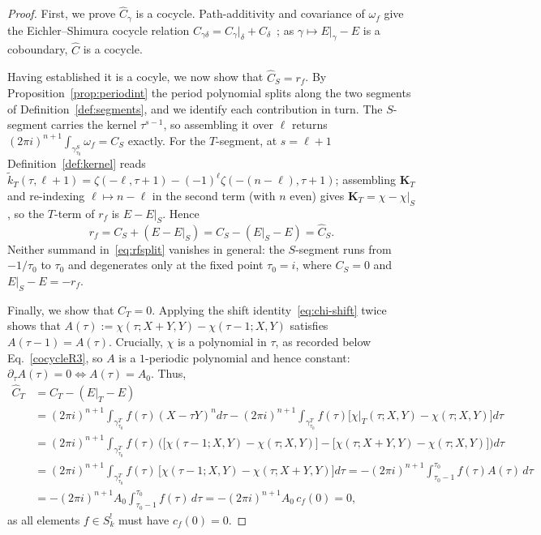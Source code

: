 \documentclass[11pt]{article}
\newcommand{\tk}{\widetilde{k}_T}
\begin{document}
\begin{proof}
First, we prove $\hat C_\gamma$ is a cocycle. Path-additivity and covariance of $\omega_f$ give the Eichler--Shimura cocycle relation
$C_{\gamma\delta}=C_\gamma|_\delta+C_\delta$~\cite{BCD2018,KZ1984}; as $\gamma\mapsto E|_\gamma-E$ is a
coboundary, $\hat C$ is a cocycle.

Having established it is a cocyle, we now show that $\hat C_S=r_f$. By
Proposition~\ref{prop:periodint} the period polynomial splits along the two segments of
Definition~\ref{def:segments}, and we identify each contribution in turn. The $S$-segment carries
the kernel $\tau^{s-1}$, so assembling it over $\ell$ returns
$(2\pi i)^{n+1}\int_{\gamma^S_{\tau_0}}\omega_f=C_S$ exactly. For the $T$-segment, at $s=\ell+1$
Definition~\ref{def:kernel} reads
$\tk(\tau,\ell+1)=\zeta(-\ell,\tau+1)-(-1)^\ell\zeta(-(n-\ell),\tau+1)$; assembling $\mathbf K_T$ and
re-indexing $\ell\mapsto n-\ell$ in the second term (with $n$ even) gives $\mathbf K_T=\chi-\chi|_S$,
so the $T$-term of $r_f$ is $E-E|_S$. Hence
\begin{equation}\label{eq:rfsplit}
r_f=C_S+(E-E|_S)=C_S-(E|_S-E)=\hat C_S .
\end{equation}
Neither summand in~\eqref{eq:rfsplit} vanishes in general: the $S$-segment runs from $-1/\tau_0$ to
$\tau_0$ and degenerates only at the fixed point $\tau_0=i$, where $C_S=0$ and $E|_S-E=-r_f$.

Finally, we show that $\hat C_T=0$. Applying the shift identity~\eqref{eq:chi-shift} twice shows
that $A(\tau):=\chi(\tau;X+Y,Y)-\chi(\tau-1;X,Y)$ satisfies $A(\tau-1)=A(\tau)$. Crucially,
$\chi$ is a polynomial in $\tau$, as recorded below Eq.~\eqref{cocycleR3}, so $A$ is a
$1$-periodic polynomial and hence constant:
$\partial_\tau A(\tau) = 0 \Leftrightarrow A(\tau) = A_0$. Thus,
\begin{align}
\hat C_T
&=C_T-(E|_T-E)
\nonumber\\ &
=(2\pi i)^{n+1}\int_{\gamma^T_{\tau_0}} f(\tau) (X - \tau Y)^n d\tau
- (2\pi i)^{n+1}\int_{\gamma^T_{\tau_0}} f(\tau)\big[\chi|_T(\tau; X, Y)-\chi(\tau; X, Y)\big] d\tau \nonumber\\
&=(2\pi i)^{n+1}\int_{\gamma^T_{\tau_0}} f(\tau)\,\bigg(\big[\chi(\tau-1; X, Y)-\chi(\tau; X, Y)\big] - \big[\chi(\tau; X+Y, Y)-\chi(\tau; X, Y)\big] \bigg) d\tau \nonumber\\
&=(2\pi i)^{n+1}\int_{\gamma^T_{\tau_0}} f(\tau)\,\big[\chi(\tau-1; X, Y)-\chi(\tau; X+Y, Y)\big] d\tau 
=-(2\pi i)^{n+1} \int_{\tau_0-1}^{\tau_0} f(\tau)A(\tau)\,d\tau \nonumber\\
&=-(2\pi i)^{n+1}A_0 \int_{\tau_0-1}^{\tau_0} f(\tau)\,d\tau
=-(2\pi i)^{n+1}A_0\,c_f(0)=0,
\end{align}
as all elements $f \in S_k^!$ must have $c_f(0) = 0$.
\end{proof}
\end{document}
